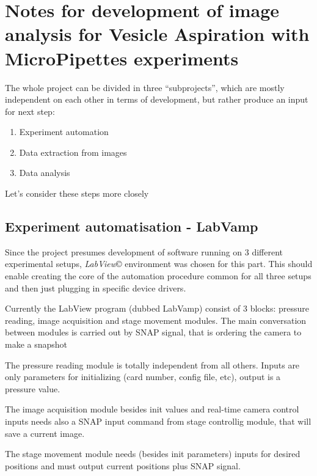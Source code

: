 
\chapter{Notes for development of image analysis for Vesicle Aspiration with MicroPipettes experiments}\label{chap:devnotes}

The whole project can be divided in three ``subprojects'', which are mostly independent on each other in terms of development, but rather produce an input for next step:
\begin{enumerate}
	\item Experiment automation
	\item Data extraction from images
	\item Data analysis
\end{enumerate}
Let's consider these steps more closely

\section{Experiment automatisation - LabVamp}\label{experiment}

Since the project presumes development of software running on 3 different experimental setups, \emph{LabView}\copyright{} environment was chosen for this part. This should enable creating the core of the automation procedure common for all three setups and then just plugging in specific device drivers.

Currently the LabView program (dubbed LabVamp) consist of 3 blocks: pressure reading, image acquisition and stage movement modules. The main conversation between modules is carried out by SNAP signal, that is ordering the camera to make a snapshot

The pressure reading module is totally independent from all others. Inputs are only parameters for initializing (card number, config file, etc), output is a pressure value.

The image acquisition module besides init values and real-time camera control inputs needs also a SNAP input command from stage controllig module, that will save a current image.

The stage movement module needs (besides init parameters) inputs for desired positions and must output current positions plus SNAP signal.

